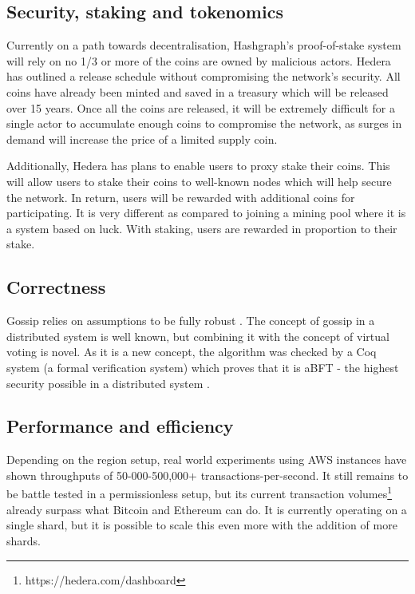 \subsection{Security, staking and tokenomics}
Currently on a path towards decentralisation, Hashgraph's proof-of-stake system will rely on no 1/3 or more of the coins are owned by malicious actors. Hedera has outlined a release schedule without compromising the network's security. All coins have already been minted and saved in a treasury which will be released over 15 years\cite{economics2020hedera}. Once all the coins are released, it will be extremely difficult for a single actor to accumulate enough coins to compromise the network, as surges in demand will increase the price of a limited supply coin.

Additionally, Hedera has plans to enable users to proxy stake their coins. This will allow users to stake their coins to well-known nodes which will help secure the network\cite{madsen2019hedera}. In return, users will be rewarded with additional coins for participating. It is very different as compared to joining a mining pool where it is a system based on luck. With staking, users are rewarded in proportion to their stake.

\subsection{Correctness}
Gossip relies on assumptions to be fully robust \cite{alvisi}. The concept of gossip in a distributed system is well known, but combining it with the concept of virtual voting is novel. As it is a new concept, the algorithm was checked by a Coq system (a formal verification system) which proves that it is aBFT - the highest security possible in a distributed system \cite{coq2018}.

\subsection{Performance and efficiency}

Depending on the region setup, real world experiments using AWS instances have shown throughputs of 50-000-500,000+ transactions-per-second\cite{baird2018hedera}. It still remains to be battle tested in a permissionless setup, but its current transaction volumes\footnote{https://hedera.com/dashboard} already surpass what Bitcoin and Ethereum can do. It is currently operating on a single shard, but it is possible to scale this even more with the addition of more shards.

